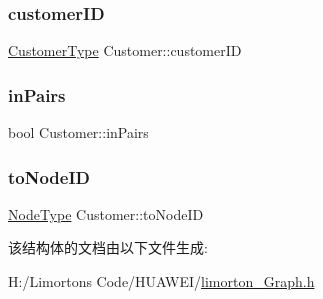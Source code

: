 \mbox{\label{struct_customer_a6a36ab5abc6d6e2340dd07443034778d}} 
\subsubsection{\texorpdfstring{customer\+ID}{customerID}}
{\footnotesize\ttfamily \hyperlink{limorton___graph_8h_ad078283245fcc340f88e58ec4c9243b3}{Customer\+Type} Customer\+::customer\+ID}

\mbox{\label{struct_customer_a8747b65630d2b105031db444169a7bc2}} 
\subsubsection{\texorpdfstring{in\+Pairs}{inPairs}}
{\footnotesize\ttfamily bool Customer\+::in\+Pairs}

\mbox{\label{struct_customer_a709de116d5bd92decf3f2cfddd3a7a45}} 
\subsubsection{\texorpdfstring{to\+Node\+ID}{toNodeID}}
{\footnotesize\ttfamily \hyperlink{limorton___graph_8h_a1b1a96beadaa686056e47989bf2a037e}{Node\+Type} Customer\+::to\+Node\+ID}



该结构体的文档由以下文件生成\+:\begin{DoxyCompactItemize}
\item 
H\+:/\+Limorton\textquotesingle{}s Code/\+H\+U\+A\+W\+E\+I/\hyperlink{limorton___graph_8h}{limorton\+\_\+\+Graph.\+h}\end{DoxyCompactItemize}
